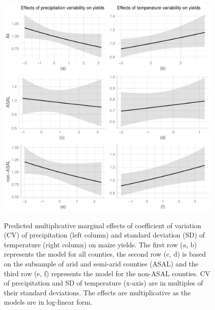 \documentclass[12pt]{iopart}
\begin{document}
\begin{itemize}
  \begin{figure}
   \includegraphics{Figure2a_2f.pdf}\label{MarEff2}
\caption{Predicted multiplicative marginal effects of coefficient of variation (CV) of precipitation (left column) and standard deviation (SD) of temperature (right column) on maize yields. The first row (a, b) represents the model for all counties, the second row (c, d) is based on the subsample of arid and semi-arid counties (ASAL) and the third row (e, f) represents the model for the non-ASAL counties. CV of precipitation and SD of temperature (x-axis) are in multiples of their standard deviations. The effects are multiplicative as the models are in log-linear form.}
\end{figure}


\end{itemize}
\end{document}
